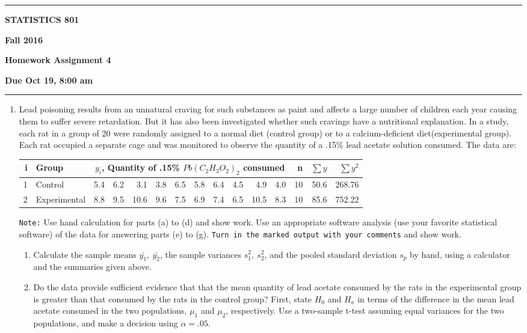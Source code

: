 \documentclass[11pt]{article}
\begin{document}
\hrule
\medskip
\centerline{\textbf{STATISTICS 801}}\hfill \textbf{Fall 2016}
\centerline{\textbf{Homework Assignment 4}}
\centerline{\textbf{Due Oct 19, 8:00 am}}
\smallskip
\hrule
\smallskip
\begin{enumerate}
\item Lead poisoning results from an unnatural craving for such substances as paint
and affects a large number of children each year causing them to suffer severe retardation. 
But it has also been investigated whether such cravings have a nutritional explanation. In a
study, each rat in a group of 20 were randomly assigned to a normal diet (control group) 
or to a calcium-deficient diet(experimental group). Each rat occupied a separate cage and was monitored to observe 
the quantity of a .15\% lead acetate solution consumed. The data are:
\begin{center}
\begin{tabular}[7]{r|l|rrrrrrrrrr|rrr} \hline
i&Group & \multicolumn{10}{|c|}{$y_i$, Quantity of .15\%	$Pb(C_2H_3O_2)_2$  consumed} &n &$\sum{y}$ & $\sum{y^2}$\\ \hline
1&Control  & 5.4 & 6.2 & 3.1 & 3.8 & 6.5 & 5.8 & 6.4 & 4.5 & 4.9 & 4.0 & 10 & 50.6 & 268.76\\
2&Experimental & 8.8 & 9.5 & 10.6 & 9.6 & 7.5 & 6.9 & 7.4 & 6.5 & 10.5 & 8.3 & 10 & 85.6 & 752.22\\ \hline
\end{tabular}
\end{center}
{\tt Note:}  Use hand calculation for parts (a) to (d) and show work. Use an appropriate 
software analysis (use your favorite statistical software) of the data for answering parts (e) to (g). 
{\tt Turn in the marked output with your comments} and show work. 
\begin{enumerate}
\item Calculate the sample means $\bar{y_1},\ \bar{y_2}$, the sample variances
$s_1^2,\ s_2^2$, and the pooled standard deviation $s_p$ by hand, using a calculator and the summaries given above.\\[1.5in]
\item Do the data provide sufficient evidence that that the mean quantity of
lead acetate consumed by the rats in the experimental group is
greater than that consumed by the rats in the control group?
First, state $H_0$ and $H_a$ in terms of the difference in the mean lead acetate consumed 
in the two populations, $\mu_1$ and $\mu_2$, respectively. Use a two-sample t-test  
assuming equal variances for the  two populations, and make a decision using $\alpha=.05$.\\[2in]

\end{enumerate}
\end{enumerate}
\end{document}
